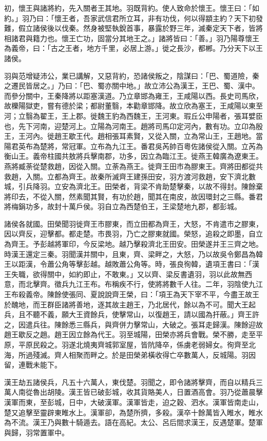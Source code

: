 \begin{pinyinscope}
初，懷王與諸將約，先入關者王其地。羽既背約。使人致命於懷王。懷王曰：「如約。」羽乃曰：「懷王者，吾家武信君所立耳，非有功伐，何以得顓主約？天下初發難，假立諸侯後以伐秦。然身被堅執銳首事，暴露於野三年，滅秦定天下者，皆將相諸君與籍力也。懷王亡功，固當分其地王之。」諸將皆曰：「善。」羽乃陽尊懷王為義帝，曰：「古之王者，地方千里，必居上游。」徙之長沙，都郴。乃分天下以王諸侯。

羽與范增疑沛公，業已講解，又惡背約，恐諸侯叛之，陰謀曰：「巴、蜀道險，秦之遷民皆居之。」乃曰：「巴、蜀亦關中地。」故立沛公為漢王，王巴、蜀、漢中。而參分關中，王秦降將以距塞漢道。乃立章邯為雍王，王咸陽以西。長史司馬欣，故櫟陽獄吏，嘗有德於梁；都尉董翳，本勸章邯降。故立欣為塞王，王咸陽以東至河；立翳為翟王，王上郡。徙魏王豹為西魏王，王河東。瑕丘公申陽者，張耳嬖臣也，先下河南，迎楚河上。立陽為河南王。趙將司馬卬定河內，數有功。立卬為殷王，王河內。徙趙王歇王代。趙相張耳素賢，又從入關，立為常山王，王趙地。當陽君英布為楚將，常冠軍。立布為九江王。番君吳芮帥百粵佐諸侯從入關。立芮為衡山王。義帝柱國共敖將兵擊南郡，功多，因立為臨江王。徙燕王韓廣為遼東王。燕將臧荼從楚救趙，因從入關。立荼為燕王。徙齊王田市為膠東王。齊將田都從共救趙，入關。立都為齊王。故秦所滅齊王建孫田安，羽方渡河救趙，安下濟北數城，引兵降羽。立安為濟北王。田榮者，背梁不肯助楚擊秦，以故不得封。陳餘棄將印去，不從入關，然素聞其賢，有功於趙，聞其在南皮，故因環封之三縣。番君將梅鋗功多，故封十萬戶侯。羽自立為西楚伯王，王梁楚地九郡，都彭城。

諸侯各就國。田榮聞羽徙齊王市膠東，而立田都為齊王，大怒，不肯遣市之膠東，因以齊反，迎擊都。都走楚。市畏羽，乃亡之膠東就國。榮怒，追殺之即墨，自立為齊王。予彭越將軍印，今反梁地。越乃擊殺濟北王田安。田榮遂并王三齊之地。時漢王還定三秦。羽聞漢并關中，且東，齊、梁畔之，大怒，乃以故吳令鄭昌為韓王以距漢，令蕭公角等擊彭越。越敗蕭公角等。時，張良徇韓，遺項王書曰：「漢王失職，欲得關中，如約即止，不敢東。」又以齊、梁反書遺羽，羽以此故無西意，而北擊齊。徵兵九江王布。布稱疾不行，使將將數千人往。二年，羽陰使九江王布殺義帝。陳餘使張同、夏說說齊王榮，曰：「項王為天下宰不平，今盡王故王於醜地，而王群臣諸將善地，逐其故主趙王，乃北居代，餘以為不可。聞大王起兵，且不聽不義，願大王資餘兵，使擊常山，以復趙王，請以國為扞蔽。」齊王許之，因遣兵往。陳餘悉三縣兵，與齊併力擊常山，大破之。張耳走歸漢。陳餘迎故趙王歇反之趙。趙王因立餘為代王。羽至城陽，田榮亦將兵會戰。榮不勝，走至平原，平原民殺之。羽遂北燒夷齊城郭室屋，皆阬降卒，係虜老弱婦女。徇齊至北海，所過殘滅。齊人相聚而畔之。於是田榮弟橫收得亡卒數萬人，反城陽。羽因留，連戰未能下。

漢王劫五諸侯兵，凡五十六萬人，東伐楚。羽聞之，即令諸將擊齊，而自以精兵三萬人南從魯出胡陵。漢王皆已破彭城，收其貨賂美人，日置酒高會。羽乃從蕭晨擊漢軍而東，至彭城，日中，大破漢軍。漢軍皆走，迫之穀、泗水。漢軍皆南走山，楚又追擊至靈辟東睢水上。漢軍卻，為楚所擠，多殺。漢卒十餘萬皆入睢水，睢水為不流。漢王乃與數十騎遁去。語在高紀。太公、呂后間求漢王，反遇楚軍。楚軍與歸，羽常置軍中。


\end{pinyinscope}
